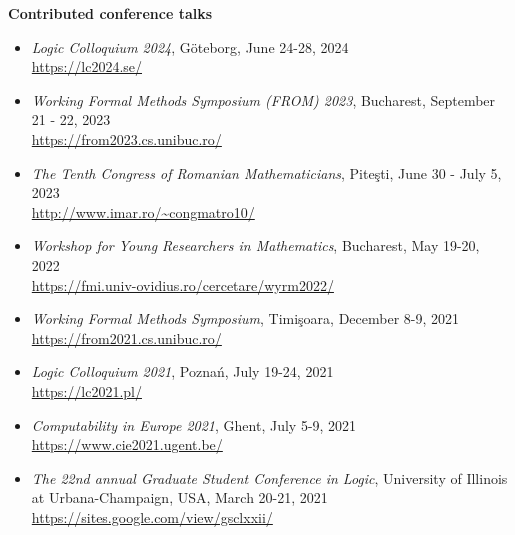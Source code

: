 \documentclass[letterpaper,11pt,oneside]{article}
\begin{document}
\noindent
\large{\textbf{Contributed conference talks}}
\normalsize
\begin{itemize}
    \item \emph{Logic Colloquium 2024},
    G\"{o}teborg, June 24-28, 2024 \\ 
    \url{https://lc2024.se/}
    \item \emph{Working Formal Methods Symposium (FROM) 2023}, 
    Bucharest, September 21 - 22, 2023 \\ 
    \url{https://from2023.cs.unibuc.ro/}
    \item \emph{The Tenth Congress of Romanian Mathematicians},
    Pite\c{s}ti, June 30 - July 5, 2023 \\ 
    \url{http://www.imar.ro/~congmatro10/}
    \item \emph{Workshop for Young Researchers in Mathematics},
    Bucharest, May 19-20, 2022 \\
    \url{https://fmi.univ-ovidius.ro/cercetare/wyrm2022/}
    \item \emph{Working Formal Methods Symposium},
    Timi\c{s}oara, December 8-9, 2021 \\
    \url{https://from2021.cs.unibuc.ro/}
    \item \emph{Logic Colloquium 2021}, 
    Pozna\'n, July 19-24, 2021 \\ 
    \url{https://lc2021.pl/}
    \item \emph{Computability in Europe 2021}, 
    Ghent, July 5-9, 2021 \\ 
    \url{https://www.cie2021.ugent.be/}
    \item \emph{The 22nd annual Graduate Student Conference in Logic}, 
    University of Illinois at Urbana-Champaign, 
    USA, March 20-21, 2021 \\ 
    \url{https://sites.google.com/view/gsclxxii/}
\end{itemize}
\mbox{}
\end{document}
